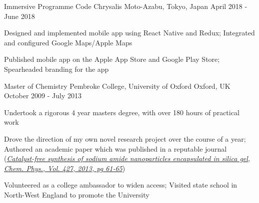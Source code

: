 
\begin{cventries}

  \cventry
  {Immersive Programme} %
  {Code Chrysalis} %
  {Moto-Azabu, Tokyo, Japan} %
  {April 2018 - June 2018} %
  {
    \begin{cvitems} %
      \item {Designed and implemented mobile app using React Native and Redux; Integrated and configured Google Maps/Apple Maps}
      \item {Published mobile app on the Apple App Store and Google Play Store; Spearheaded branding for the app}
    \end{cvitems}
  }

  \cventry
  {Master of Chemistry} %
  {Pembroke College, University of Oxford} %
  {Oxford, UK} %
  {October 2009 - July 2013} %
  {
    \begin{cvitems} %
      \item {Undertook a rigorous 4 year masters degree, with over 180 hours of practical work}
      \item {Drove the direction of my own novel research project over the course of a year; Authored an academic paper which was published in a reputable journal (\href{https://doi.org/10.1016/j.chemphys.2013.06.003}{\textit{Catalyst-free synthesis of sodium amide nanoparticles encapsulated in silica gel, Chem. Phys., Vol. 427, 2013, pg 61-65}})}
      \item {Volunteered as a college ambassador to widen access; Visited state school in North-West England to promote the University}
    \end{cvitems}
  }

\end{cventries}
